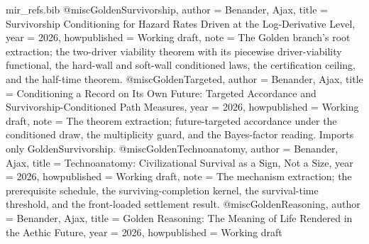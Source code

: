 \begin{filecontents}[overwrite]{mir_refs.bib}
@misc{GoldenSurvivorship,
  author       = {Benander, Ajax},
  title        = {Survivorship Conditioning for Hazard Rates Driven at the Log-Derivative Level},
  year         = {2026},
  howpublished = {Working draft},
  note         = {The Golden branch's root extraction; the two-driver viability
                  theorem with its piecewise driver-viability functional, the
                  hard-wall and soft-wall conditioned laws, the certification
                  ceiling, and the half-time theorem.}
}
@misc{GoldenTargeted,
  author       = {Benander, Ajax},
  title        = {Conditioning a Record on Its Own Future: Targeted Accordance and Survivorship-Conditioned Path Measures},
  year         = {2026},
  howpublished = {Working draft},
  note         = {The theorem extraction; future-targeted accordance under the
                  conditioned draw, the multiplicity guard, and the Bayes-factor
                  reading. Imports only GoldenSurvivorship.}
}
@misc{GoldenTechnoanatomy,
  author       = {Benander, Ajax},
  title        = {Technoanatomy: Civilizational Survival as a Sign, Not a Size},
  year         = {2026},
  howpublished = {Working draft},
  note         = {The mechanism extraction; the prerequisite schedule, the
                  surviving-completion kernel, the survival-time threshold, and the
                  front-loaded settlement result.}
}
@misc{GoldenReasoning,
  author       = {Benander, Ajax},
  title        = {Golden Reasoning: The Meaning of Life Rendered in the Aethic Future},
  year         = {2026},
  howpublished = {Working draft}
}

\end{filecontents}
